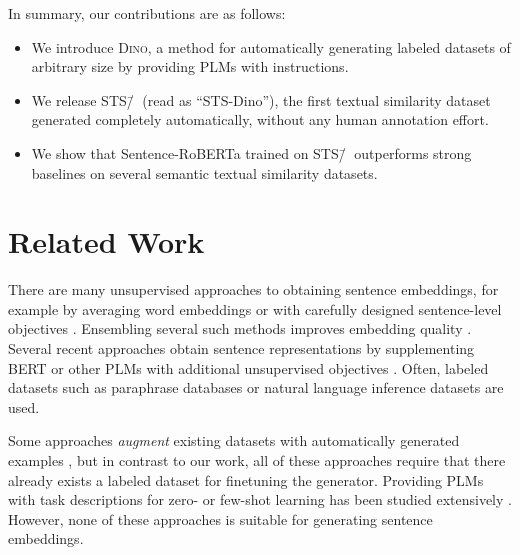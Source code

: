 \documentclass[11pt]{article}
\newcommand\ours{\textsc{Dino}}
\newcommand\ourDsFull{STS\=/🦕}
\begin{document}
In summary, our contributions are as follows:
\begin{itemize} 
\item We introduce \ours{}, a method for automatically generating labeled datasets of arbitrary size by providing PLMs with instructions.
\item We release \ourDsFull{} (read as ``STS-Dino''), the
first textual similarity dataset generated
completely automatically,
without any human annotation effort.
\item We show that Sentence-RoBERTa \citep{reimers-gurevych-2019-sentence} trained on \ourDsFull{} outperforms strong baselines on several semantic textual similarity datasets.
\end{itemize}

\section{Related Work}

There are many unsupervised approaches to obtaining sentence
embeddings, for example by averaging word
embeddings \citep{mikolov2013word2vec,Glove,bojanowski2017enriching}
or with carefully designed sentence-level
objectives \citep{pmlr-v32-le14,NIPS2015_f442d33f}.
Ensembling several such methods improves embedding quality
\citep{porner19domainadapt,porner20meta}.
Several recent approaches obtain sentence representations by supplementing BERT \citep{devlin2018bert} or other PLMs with additional unsupervised objectives \citep{zhang-etal-2020-unsupervised,li-etal-2020-sentence,wu2020clear,giorgi2020declutr}. Often, labeled datasets such as paraphrase databases \citep{wieting-gimpel-2018-paranmt} or natural language inference datasets \citep{conneau-etal-2017-supervised,cer-etal-2018-universal,reimers-gurevych-2019-sentence} are used.

Some approaches \emph{augment} existing datasets with
automatically generated
examples \citep{Anaby-Tavor_Carmeli_Goldbraich_Kantor_Kour_Shlomov_Tepper_Zwerdling_2020,papanikolaou2020dare,yang-etal-2020-generative,kumar2021data},
but in contrast to our work, all of these approaches require
that there already exists a labeled dataset for finetuning the generator.
Providing PLMs with task descriptions for zero- or few-shot learning has been studied extensively \citep[e.g.,][]{radford2018language,puri2019zeroshot,opitz2019argumentative,brown2020language,schick2020fewshot,schick2020just,schick2020exploiting,Weller_2020,gao2020making,tam2021improving}. However, none of these approaches is suitable for generating sentence embeddings.
\end{document}

